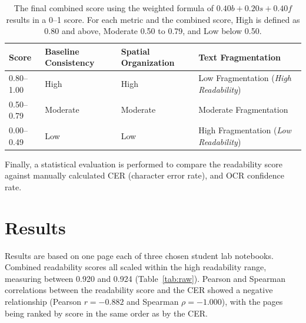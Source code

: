 \documentclass[conference]{IEEEtran}
\begin{document}
\begin{table}[!t]
  \centering
  \caption{The final combined score using the weighted formula of
  $0.40b + 0.20s + 0.40f$ results in a 0--1 score. For each metric and the
  combined score, High is defined as 0.80 and above, Moderate 0.50 to 0.79, and
  Low below 0.50.}
  \label{tab:bands}
  \footnotesize
  \setlength{\tabcolsep}{3pt}
  \renewcommand{\arraystretch}{1.15}
  \begin{tabular}{@{}l>{\raggedright\arraybackslash}p{1.45cm}>{\raggedright\arraybackslash}p{1.55cm}>{\raggedright\arraybackslash}p{2.6cm}@{}}
    \toprule
    Score & Baseline Consistency & Spatial Organization & Text Fragmentation \\
    \midrule
    \rowcolor{green!15}
    0.80--1.00 & High     & High     & Low Fragmentation (\emph{High Readability}) \\
    \rowcolor{yellow!20}
    0.50--0.79 & Moderate & Moderate & Moderate Fragmentation \\
    \rowcolor{red!12}
    0.00--0.49 & Low      & Low      & High Fragmentation (\emph{Low Readability}) \\
    \bottomrule
  \end{tabular}
\end{table}

Finally, a statistical evaluation is performed to compare the readability score
against manually calculated CER (character error rate), and OCR confidence
rate.

\section{Results}

Results are based on one page each of three chosen student lab notebooks.
Combined readability scores all scaled within the high readability range,
measuring between 0.920 and 0.924 (Table~\ref{tab:raw}). Pearson and Spearman
correlations between the readability score and the CER showed a negative
relationship (Pearson $r = -0.882$ and Spearman $\rho = -1.000$), with the pages
being ranked by score in the same order as by the CER.
\end{document}
